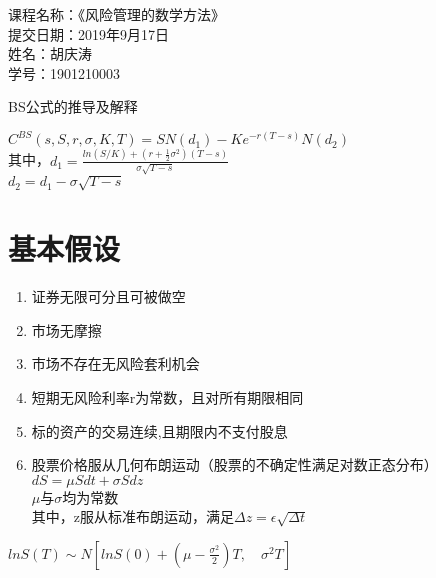 \documentclass{article}
\begin{document}
\begin{flushleft}
	课程名称：《风险管理的数学方法》\\
	提交日期：2019年9月17日\\
	姓名：胡庆涛\\
	学号：1901210003\\ 
\end{flushleft}

\begin{center}
 \LARGE BS公式的推导及解释
\end{center}

\begin{flushleft}
	 $C^{BS}(s,S,r,\sigma,K,T) = SN(d_{1})-Ke^{-r(T-s)}N(d_{2})$\\
	 其中，$d_{1}=\frac{ln(S/K)+(r+\frac{1}{2}\sigma^{2})(T-s)}{\sigma\sqrt{T-s}}$\\
	  $d_{2} = d_{1}-\sigma\sqrt{T-s}$
\end{flushleft}

\section{基本假设}
\begin{enumerate}
	\item 证券无限可分且可被做空
	\item 市场无摩擦
	\item 市场不存在无风险套利机会
	\item 短期无风险利率r为常数，且对所有期限相同
	\item 标的资产的交易连续,且期限内不支付股息
	\item 股票价格服从几何布朗运动（股票的不确定性满足对数正态分布）\\
	$ dS = \mu Sdt + \sigma Sdz $\\
	$\mu$与$\sigma$均为常数\\
	其中，z服从标准布朗运动，满足$ \Delta z = \epsilon\sqrt{\Delta t} $
\end{enumerate}

	$ lnS(T) \sim N [lnS(0)+(\mu-\frac{\sigma ^2}{2})T,\quad \sigma^2T] $
\newpage 
\end{document}
